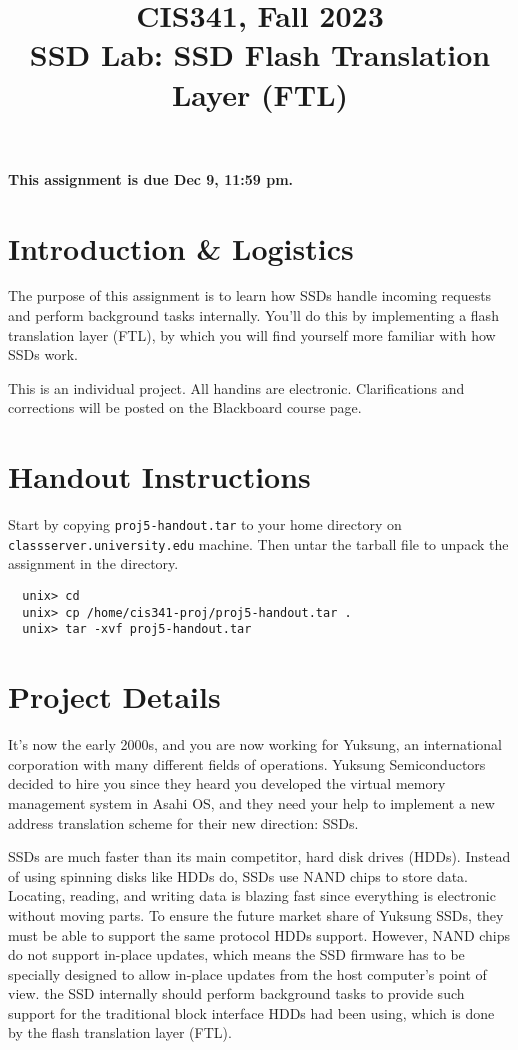 \documentclass[11pt]{article}
\begin{document}
\title{CIS341, Fall 2023\\
SSD Lab: SSD Flash Translation Layer (FTL)  \\
}

\author{}
\date{}

\maketitle
\textbf{This assignment is due Dec 9, 11:59 pm.}

\section{Introduction \& Logistics}
The purpose of this assignment is to learn how SSDs handle incoming requests and perform background tasks internally.
You'll do this by implementing a flash translation layer (FTL), by which you will find yourself more familiar with how SSDs work.

This is an individual project. All handins are electronic.
Clarifications and corrections will be posted on the Blackboard course page.

\section{Handout Instructions}

Start by copying {\tt proj5-handout.tar} to your home directory
on {\tt classserver.university.edu} machine.
Then untar the tarball file to unpack the assignment in the directory.
\begin{verbatim}
  unix> cd 
  unix> cp /home/cis341-proj/proj5-handout.tar .
  unix> tar -xvf proj5-handout.tar  
\end{verbatim}


\section{Project Details}

It's now the early 2000s,
and you are now working for Yuksung, an international corporation with many different fields of operations.
Yuksung Semiconductors decided to hire you since they heard you developed the virtual memory management system in Asahi OS,
and they need your help to implement a new address translation scheme for their new direction: SSDs.

SSDs are much faster than its main competitor, hard disk drives (HDDs). 
Instead of using spinning disks like HDDs do, SSDs use NAND chips to store data.
Locating, reading, and writing data is blazing fast since everything is electronic without moving parts.
To ensure the future market share of Yuksung SSDs, they must be able to support the same protocol HDDs support.
However, NAND chips do not support in-place updates, 
which means the SSD firmware has to be specially designed to allow in-place updates from the host computer's point of view.
the SSD internally should perform background tasks to provide such support for the traditional block interface HDDs had been using, which is done by the flash translation layer (FTL).
\end{document}
